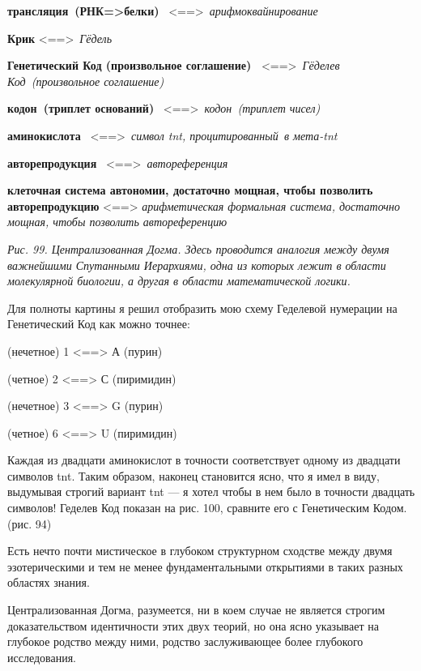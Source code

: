 \documentclass[../main.tex]{subfiles}
\begin{document}
\textbf{трансляция~(РНК=\textgreater белки)} ~\textless==\textgreater~\emph{арифмоквайнирование}

\textbf{Крик} \textless==\textgreater~\emph{Гёдель} ~

\textbf{Генетический Код (произвольное соглашение)~} \textless==\textgreater~\emph{Гёделев Код~(произвольное соглашение)}

\textbf{кодон~(триплет оснований)} ~\textless==\textgreater~\emph{кодон~(триплет чисел)}

\textbf{аминокислота} ~\textless==\textgreater~\emph{символ \acs{tnt}, процитированный~в мета-\acs{tnt}}

\textbf{авторепродукция} ~\textless==\textgreater~\emph{автореференция}

\textbf{клеточная система автономии, достаточно мощная, чтобы позволить авторепродукцию} \textless==\textgreater{} \emph{арифметическая формальная система, достаточно мощная, чтобы позволить автореференцию}

\emph{Рис. 99. Централизованная Догма. Здесь проводится аналогия между двумя важнейшими Спутанными Иерархиями, одна из которых лежит в области молекулярной биологии, а другая в области математической логики.}

Для полноты картины я решил отобразить мою схему Геделевой нумерации на Генетический Код как можно точнее:

(нечетное) 1 \textless==\textgreater{} А (пурин)

(четное) 2 \textless==\textgreater{} С (пиримидин)

(нечетное) 3 \textless==\textgreater{} G (пурин)

(четное) 6 \textless==\textgreater{} U (пиримидин)

Каждая из двадцати аминокислот в точности соответствует одному из двадцати символов \acs{tnt}\@. Таким образом, наконец становится ясно, что я имел в виду, выдумывая строгий вариант \acs{tnt} --- я хотел чтобы в нем было в точности двадцать символов! Геделев Код показан на рис. 100, сравните его с Генетическим Кодом. (рис. 94)

Есть нечто почти мистическое в глубоком структурном сходстве между двумя эзотерическими и тем не менее фундаментальными открытиями в таких разных областях знания.

Централизованная Догма, разумеется, ни в коем случае не является строгим доказательством идентичности этих двух теорий, но она ясно указывает на глубокое родство между ними, родство заслуживающее более глубокого исследования.
\end{document}

